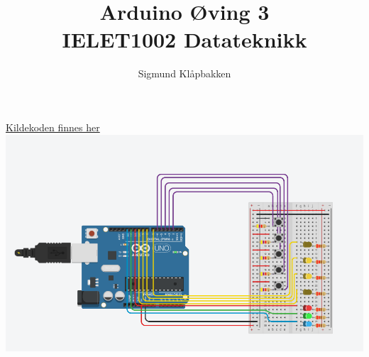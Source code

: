\documentclass[a4paper,12pt]{article}
\title{Arduino Øving 3\\ \large{IELET1002 Datateknikk}}
\author{Sigmund Klåpbakken}
\begin{document}
\maketitle
\href{https://github.com/SigJig/biel1/blob/main/biel1/datek/arduino-o3/o3.cc}{Kildekoden finnes her}
\\
\includegraphics[width=\textwidth]{screenshot}
\end{document}
